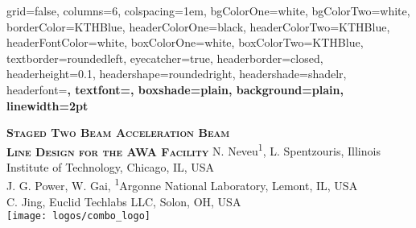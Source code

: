 \documentclass[portrait,final,paperwidth=92cm, paperheight=152cm,  fontscale=0.277]{baposter}
\begin{document}
\begin{poster}{
	grid=false,
	columns=6,
	colspacing=1em,
	bgColorOne=white,
	bgColorTwo=white,
	borderColor=KTHBlue,
	headerColorOne=black,
	headerColorTwo=KTHBlue,
	headerFontColor=white,
	boxColorOne=white,
	boxColorTwo=KTHBlue,
	textborder=roundedleft,
	eyecatcher=true,
	headerborder=closed,
	headerheight=0.1\textheight,
	headershape=roundedright,
	headershade=shadelr,
	headerfont=\Large\bf\textsc, %
	textfont={\setlength{\parindent}{0em}},
	boxshade=plain,
	background=plain,
	linewidth=2pt
}
{
	
		
} %
{\bf\textsc{Staged Two Beam Acceleration Beam\\
		\vspace{0.3em} Line Design for the AWA Facility}}%
{\vspace{1em}
	N. Neveu\textsuperscript{1}, L. Spentzouris, Illinois Institute of Technology, Chicago, IL, USA \\
	J. G. Power, W. Gai, \textsuperscript{1}Argonne National  Laboratory, Lemont, IL, USA \\
	C. Jing, Euclid Techlabs LLC, Solon, OH, USA \\
    }
{%
		\texttt{[image: logos/combo\_logo]}%
}






\end{poster}
\end{document}
